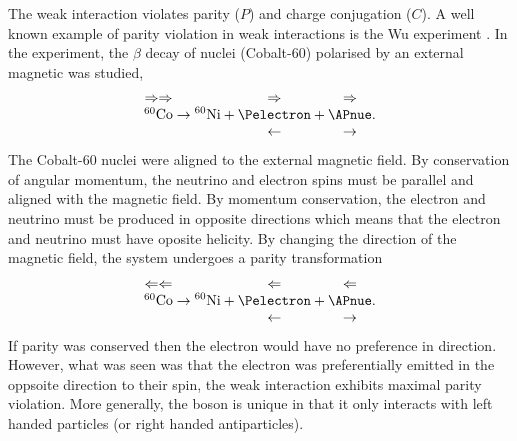 The weak interaction violates parity ($P$) and charge conjugation ($C$). A
well known example of parity violation in weak interactions is the Wu experiment
\cite{wu1957experimental}.
In the experiment, the $\beta$ decay of nuclei (Cobalt-60) polarised by an
external magnetic was studied, 
\begin{equation}
\begin{matrix}
\Rightarrow\Rightarrow \\
^{60}\mathrm{Co} \\
~   
\end{matrix}
\to
{^{60}\mathrm{Ni}}
+
\begin{matrix}
\Rightarrow \\
\Pelectron \\
\leftarrow 
\end{matrix}
+
\begin{matrix}
\Rightarrow \\
\APnue \\
\rightarrow 
\end{matrix}.
\end{equation}
The Cobalt-60 nuclei were aligned to the external magnetic field. By
conservation of angular momentum, the neutrino and electron spins must be
parallel and aligned with the magnetic field. By momentum conservation, the
electron and neutrino must be produced in opposite directions which means that
the electron and neutrino must have oposite helicity.  By changing the direction
of the magnetic field, the system undergoes a parity transformation
\begin{equation}
\begin{matrix}
\Leftarrow\Leftarrow \\
^{60}\mathrm{Co} \\
~   
\end{matrix}
\to
{^{60}\mathrm{Ni}}
+
\begin{matrix}
\Leftarrow \\
\Pelectron \\
\leftarrow 
\end{matrix}
+
\begin{matrix}
\Leftarrow \\
\APnue \\
\rightarrow 
\end{matrix}.
\end{equation}
If parity was conserved then the electron would have no preference in direction.
However, what was seen was that the electron was preferentially emitted in the
oppsoite direction to their spin, the weak interaction exhibits maximal parity
violation.
More generally, the \PWpm boson is unique in that it only interacts with left handed
particles (or right handed antiparticles).

